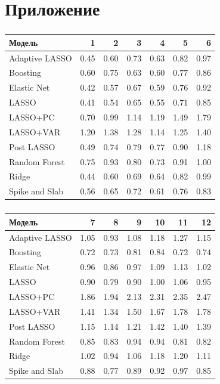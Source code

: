 \documentclass[c, dvipsnames]{beamer}  %
\begin{document}
\section{Приложение}
 \begin{frame}
 \frametitle{\insertsection} 
\framesubtitle{\insertsubsection}
\begin{table}[ht]
\centering
\begin{tabular}{lrrrrrr}
  \hline
Модель & 1 & 2 & 3 & 4 & 5 & 6 \\ 
  \hline
Adaptive LASSO & 0.45 & 0.60 & 0.73 & 0.63 & 0.82 & 0.97 \\ 
  Boosting & 0.60 & 0.75 & \alert{0.63} & 0.60 & 0.77 & 0.86 \\ 
  Elastic Net & 0.42 & 0.57 & 0.67 & 0.59 & 0.76 & 0.92 \\ 
  LASSO & \alert{0.41} & \alert{0.54} & 0.65 & \alert{0.55} & \alert{0.71} & \alert{0.85} \\ 
  LASSO+PC & 0.70 & 0.99 & 1.14 & 1.19 & 1.49 & 1.79 \\ 
  LASSO+VAR & 1.20 & 1.38 & 1.28 & 1.14 & 1.25 & 1.40 \\ 
  Post LASSO & 0.49 & 0.74 & 0.79 & 0.77 & 0.90 & 1.18 \\ 
  Random Forest & 0.75 & 0.93 & 0.80 & 0.73 & 0.91 & 1.00 \\ 
  Ridge & 0.44 & 0.60 & 0.69 & 0.64 & 0.82 & 0.99 \\ 
  Spike and Slab & 0.56 & 0.65 & 0.72 & 0.61 & 0.76 & 0.83 \\ 
   \hline
\end{tabular}
\end{table}
\end{frame}

 \begin{frame}
 \frametitle{\insertsection} 
\framesubtitle{\insertsubsection}
\begin{table}[ht]
\centering
\begin{tabular}{lrrrrrr}
  \hline
Модель & 7 & 8 & 9 & 10 & 11 & 12 \\ 
  \hline
Adaptive LASSO & 1.05 & 0.93 & 1.08 & 1.18 & 1.27 & 1.15 \\ 
  Boosting & \alert{0.72} &\alert{ 0.73} & \alert{0.81} & \alert{0.84} & \alert{0.72} & \alert{0.74} \\ 
  Elastic Net & 0.96 & 0.86 & 0.97 & 1.09 & 1.13 & 1.02 \\ 
  LASSO & 0.90 & 0.79 & 0.90 & 1.00 & 1.06 & 0.95 \\ 
  LASSO+PC & 1.86 & 1.94 & 2.13 & 2.31 & 2.35 & 2.47 \\ 
  LASSO+VAR & 1.41 & 1.34 & 1.50 & 1.67 & 1.78 & 1.78 \\ 
  Post LASSO & 1.15 & 1.14 & 1.21 & 1.42 & 1.40 & 1.39 \\ 
  Random Forest & 0.85 & 0.83 & 0.94 & 0.94 & 0.81 & 0.82 \\ 
  Ridge & 1.02 & 0.94 & 1.06 & 1.18 & 1.20 & 1.11 \\ 
  Spike and Slab & 0.88 & 0.77 & 0.89 & 0.92 & 0.97 & 0.85 \\ 
   \hline
\end{tabular}
\end{table}
\end{frame}
\end{document}
